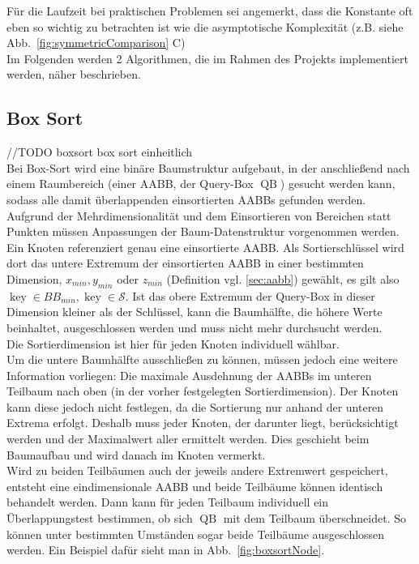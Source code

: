 Für die Laufzeit bei praktischen Problemen sei angemerkt, dass die Konstante oft eben so wichtig zu betrachten ist wie die asymptotische Komplexität (z.B. siehe Abb.~\ref{fig:symmetricComparison} C)\\
Im Folgenden werden 2 Algorithmen, die im Rahmen des Projekts implementiert werden, näher beschrieben.


\subsection{Box Sort}
\label{sec:boxsort}
//TODO boxsort box sort einheitlich\\
Bei Box-Sort \cite{houthuys1987box}
 wird eine binäre Baumstruktur aufgebaut, in der anschließend nach einem Raumbereich (einer AABB, der Query-Box
\newcommand{\qb}{\operatorname{QB}}
 $\qb$) gesucht werden kann, sodass alle damit überlappenden einsortierten AABBs gefunden werden. Aufgrund der Mehrdimensionalität und dem Einsortieren von Bereichen statt Punkten müssen Anpassungen der Baum-Datenstruktur vorgenommen werden.\\
Ein Knoten referenziert genau eine einsortierte AABB. Als Sortierschlüssel wird dort das untere Extremum der einsortierten AABB in einer bestimmten Dimension, $x_{min},y_{min}$ oder $z_{min}$  (Definition vgl. \ref{sec:aabb}) gewählt, es gilt also $\operatorname{key} \in BB_{min}, \operatorname{key} \in \mathcal{S} $. 
Ist das obere Extremum der Query-Box in dieser Dimension kleiner als der Schlüssel, kann die Baumhälfte, die höhere Werte beinhaltet, ausgeschlossen werden und muss nicht mehr durchsucht werden. \\
Die Sortierdimension ist hier für jeden Knoten individuell wählbar.\\
Um die untere Baumhälfte ausschließen zu können, müssen jedoch eine weitere Information vorliegen: Die maximale Ausdehnung der AABBs im unteren Teilbaum nach oben (in der vorher festgelegten Sortierdimension). Der Knoten kann diese jedoch nicht festlegen, da die Sortierung nur anhand der unteren Extrema erfolgt. Deshalb muss jeder Knoten, der darunter liegt, berücksichtigt werden und der Maximalwert aller ermittelt werden. Dies geschieht beim Baumaufbau und wird danach im Knoten vermerkt.\\
Wird zu beiden Teilbäumen auch der jeweils andere Extremwert gespeichert, entsteht eine eindimensionale AABB und beide Teilbäume können identisch behandelt werden. Dann kann für jeden Teilbaum individuell ein Überlappungstest bestimmen, ob sich $\qb$ mit dem Teilbaum überschneidet. So können unter bestimmten Umständen sogar beide Teilbäume ausgeschlossen werden. Ein Beispiel dafür sieht man in Abb.~\ref{fig:boxsortNode}.\\

